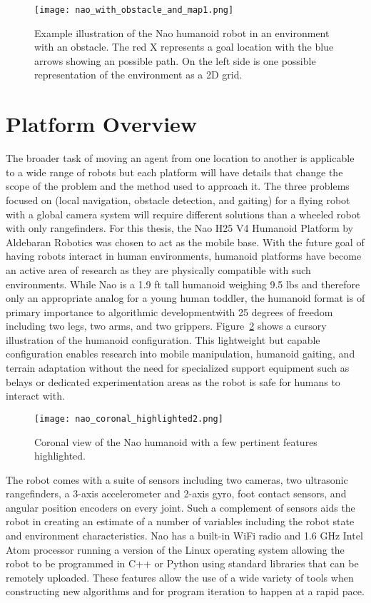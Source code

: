 \begin{figure}[h!]
	\centering
	\texttt{[image: nao\_with\_obstacle\_and\_map1.png]}
	\caption
	{Example illustration of the Nao humanoid robot in an environment with an obstacle. The red X represents a goal
		location with the blue arrows showing an possible path. On the left side is one possible representation
		of the environment as a 2D grid.}
	\label{fig:nao_with_map1}
\end{figure}


\section{Platform Overview}
The broader task of moving an agent from one location to another is applicable to a wide range of robots but
each platform will have details that change the scope of the problem and the method used to approach it.
The three problems focused on (local navigation, obstacle detection, and gaiting) for a flying robot with 
a global camera system will require different solutions than a wheeled robot with only rangefinders.
For this thesis, the Nao H25 V4 Humanoid Platform by Aldebaran Robotics was chosen to act as the mobile base. 
With the future goal of having robots interact in human environments, humanoid platforms have become an active
area of research as they are physically compatible with such environments. 
While Nao is a 1.9 ft tall humanoid weighing 9.5 lbs and therefore only an appropriate analog for a young human toddler,
the humanoid format is of primary importance to algorithmic development\.
with 25 degrees of freedom including two legs, two arms, and two grippers. 
Figure~\ref{fig:nao_diagram1} shows a cursory illustration of the humanoid configuration.
This lightweight but capable configuration enables research into mobile manipulation, humanoid gaiting, and terrain adaptation
without the need for specialized support equipment such as belays or dedicated experimentation areas as the
robot is safe for humans to interact with.

\begin{figure}
	\centering
	\texttt{[image: nao\_coronal\_highlighted2.png]}
	\caption
	{Coronal view of the Nao humanoid with a few pertinent features highlighted. }
	\label{fig:nao_diagram1}
\end{figure}

The robot comes with a suite of sensors including two cameras, two ultrasonic rangefinders, 
a 3-axis accelerometer and 2-axis gyro, foot contact sensors, and angular position encoders on every joint.
Such a complement of sensors aids the robot in creating an estimate of a number of variables including 
the robot state and environment characteristics. 
Nao has a built-in WiFi radio and 1.6 GHz Intel Atom processor running a version of the Linux operating system 
allowing the robot to be programmed in C++ or Python using standard libraries that can be remotely uploaded.
These features allow the use of a wide variety of tools when constructing new algorithms and for program
iteration to happen at a rapid pace.

